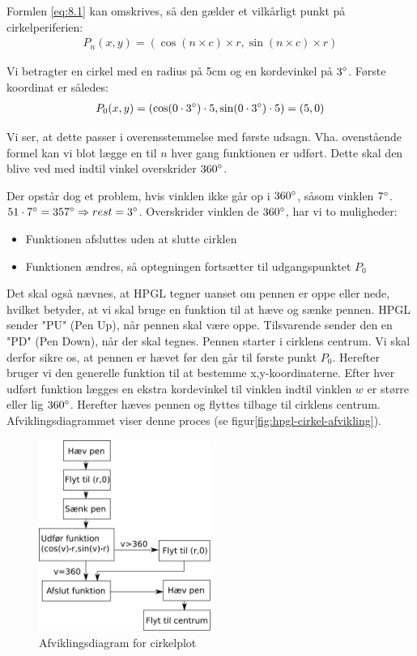 Formlen \vref{eq:8.1} kan omskrives, så den gælder et vilkårligt punkt
på cirkelperiferien:
\begin{align}
P_n(x, y)=(\cos(n\times c)\times r, \sin(n\times c)\times r)
\end{align}

Vi betragter en cirkel med en radius på 5cm og en kordevinkel på
$3^\circ$. Første koordinat er således:
\begin{align*}
P_0(x, y)&=(\cos(0\cdot 3^\circ)\cdot 5 , \sin(0\cdot 3^\circ)\cdot 5)=(5, 0) \\
\end{align*}

Vi ser, at dette passer i overensstemmelse med første
udsagn. Vha. ovenstående formel kan vi blot lægge en til $n$ hver gang
funktionen er udført. Dette skal den blive ved med indtil vinkel
overskrider $360^\circ$.


Der opstår dog et problem, hvis vinklen ikke går op i $360^\circ$,
såsom vinklen $7^\circ$. $51\cdot 7^\circ = 357^\circ \Rightarrow
rest = 3^\circ$. Overskrider vinklen de $360^\circ$, har vi to
muligheder:
\begin{itemize} \firmlist
\item Funktionen afsluttes uden at slutte cirklen
\item Funktionen ændres, så optegningen fortsætter til udgangspunktet $P_0$
\end{itemize}
Det skal også nævnes, at HPGL tegner uanset om pennen er oppe eller
nede, hvilket betyder, at vi skal bruge en funktion til at hæve og
sænke pennen. HPGL sender "PU" (Pen Up), når pennen skal være
oppe. Tilsvarende sender den en "PD" (Pen Down), når der skal
tegnes. Pennen starter i cirklens centrum. Vi skal derfor sikre os, at
pennen er hævet før den går til første punkt $P_0$. Herefter bruger vi
den generelle funktion til at bestemme x,y-koordinaterne. Efter hver
udført funktion lægges en ekstra kordevinkel til vinklen indtil
vinklen $w$ er større eller lig $360^\circ$. Herefter hæves pennen og
flyttes tilbage til cirklens centrum. Afviklingsdiagrammet viser denne
proces (se figur\vref{fig:hpgl-cirkel-afvikling}).

\begin{figure}[htbp]
  \centering
  \includegraphics[width=0.5\textwidth]{./img/afviklingsdiagram-cirkel}
  \caption{Afviklingsdiagram for cirkelplot}
  \label{fig:hpgl-cirkel-afvikling}
\end{figure}


